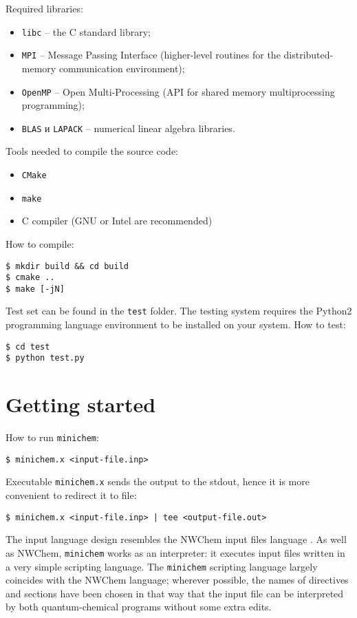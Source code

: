 \documentclass[a4paper, 12pt]{article}
\begin{document}
Required libraries:

\begin{itemize}
\item \texttt{libc} -- the C standard library;
\item \texttt{MPI} -- Message Passing Interface (higher-level routines for the distributed-memory communication environment);
\item \texttt{OpenMP} -- Open Multi-Processing (API for shared memory multiprocessing programming);
\item \texttt{BLAS} и \texttt{LAPACK} -- numerical linear algebra libraries.
\end{itemize}

Tools needed to compile the source code:
\begin{itemize}
\item \texttt{CMake}
\item \texttt{make}
\item C compiler (GNU or Intel are recommended)
\end{itemize}

How to compile:

\begin{lstlisting}
$ mkdir build && cd build
$ cmake ..
$ make [-jN]
\end{lstlisting}

Test set can be found in the \texttt{test} folder. The testing system requires the Python2 programming language environment to be installed on your system. How to test:

\begin{lstlisting}
$ cd test
$ python test.py
\end{lstlisting}


\section{Getting started}

How to run \texttt{minichem}:
\begin{lstlisting}
$ minichem.x <input-file.inp>
\end{lstlisting}

Executable \texttt{minichem.x} sends the output to the stdout, hence it is more convenient to redirect it to file:

\begin{lstlisting}
$ minichem.x <input-file.inp> | tee <output-file.out>
\end{lstlisting}

The input language design resembles the NWChem input files language \cite{nwchem2010}. As well as NWChem, \texttt{minichem} works as an interpreter: it executes input files written in a very simple scripting language. The \texttt{minichem} scripting language largely coincides with the NWChem language; 
wherever possible, the names of directives and sections have been chosen in that way that the input file can be interpreted by both quantum-chemical programs without some extra edits.
\end{document}
